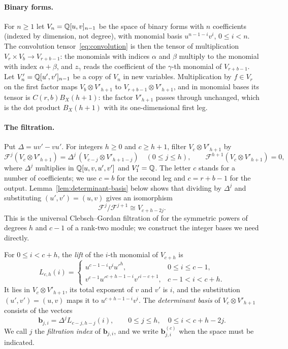 \paragraph{Binary forms.}
For \(n\ge1\) let \(V_n=\mathbb Q[u,v]_{n-1}\) be the space of binary forms with
\(n\) coefficients (indexed by dimension, not degree), with monomial basis
\(u^{n-1-i}v^i\), \(0\le i<n\). The convolution
tensor~\eqref{eq:convolution} is then the tensor of multiplication
\(V_r\times V_b\to V_{r+b-1}\): the monomials with indices \(\alpha\) and
\(\beta\) multiply to the monomial with index \(\alpha+\beta\), and
\(z_\gamma\) reads the coefficient of the \(\gamma\)-th monomial of
\(V_{r+b-1}\). Let \(V'_n=\mathbb Q[u',v']_{n-1}\) be a copy of \(V_n\)
in new variables. Multiplication by \(f\in V_r\) on the first factor maps
\(V_b\otimes V'_{h+1}\) to \(V_{r+b-1}\otimes V'_{h+1}\), and in monomial
bases its tensor is \(C(r,b)B_X(h+1)\): the factor \(V'_{h+1}\) passes
through unchanged, which is the dot product \(B_X(h+1)\) with its
one-dimensional first leg.

\paragraph{The filtration.}
Put \(\Delta=uv'-vu'\). For integers \(h\ge0\) and \(c\ge h+1\), filter
\(V_c\otimes V'_{h+1}\) by
\[
 \mathcal F^j(V_c\otimes V'_{h+1})=\Delta^j\,(V_{c-j}\otimes V'_{h+1-j})
 \quad(0\le j\le h),\qquad
 \mathcal F^{h+1}(V_c\otimes V'_{h+1})=0,
\]
where \(\Delta^j\) multiplies in \(\mathbb Q[u,v,u',v']\) and \(V'_1=\mathbb Q\). The
letter \(c\) stands for a number of coefficients; we use \(c=b\) for the
second leg and \(c=r+b-1\) for the output.
Lemma~\ref{lem:determinant-basis} below shows that dividing by
\(\Delta^j\) and substituting \((u',v')=(u,v)\) gives an isomorphism
\begin{equation}\label{eq:filtration-quotient}
 \mathcal F^j/\mathcal F^{j+1}\cong V_{c+h-2j}.
\end{equation}
This is the universal Clebsch--Gordan filtration of
\citet[Lemma~2.5, Theorem~2.8, Corollary~2.9 and Definition~2.10]{Maakestad23}
for the symmetric powers of degrees \(h\) and \(c-1\) of a rank-two
module; we construct the integer bases we need directly.

For \(0\le i<c+h\), the \emph{lift} of the \(i\)-th monomial of
\(V_{c+h}\) is
\[
 L_{c,h}(i)=
 \begin{cases}
 u^{c-1-i}v^iu'^h,&0\le i\le c-1,\\
 v^{c-1}u'^{c+h-1-i}v'^{i-c+1},&c-1<i<c+h.
 \end{cases}
\]
It lies in \(V_c\otimes V'_{h+1}\), its total exponent of \(v\) and \(v'\)
is \(i\), and the substitution \((u',v')=(u,v)\) maps it to
\(u^{c+h-1-i}v^i\). The \emph{determinant basis} of
\(V_c\otimes V'_{h+1}\) consists of the vectors
\begin{equation}\label{eq:determinant-basis}
 \mathbf b_{j,i}=\Delta^jL_{c-j,h-j}(i),\qquad
 0\le j\le h,\quad 0\le i<c+h-2j.
\end{equation}
We call \(j\) the \emph{filtration index} of \(\mathbf b_{j,i}\), and we
write \(\mathbf b^{(c)}_{j,i}\) when the space must be indicated.

